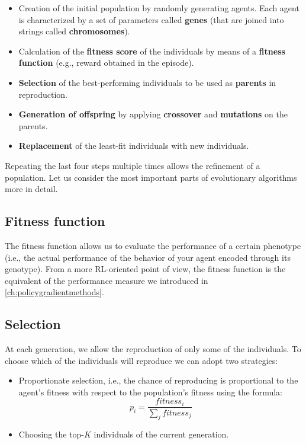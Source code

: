 \begin{itemize}
    \item Creation of the initial population by randomly generating agents. Each agent is characterized by a set of parameters called \textbf{genes} (that are joined into strings called \textbf{chromosomes}).
    \item Calculation of the \textbf{fitness score} of the individuals by means of a \textbf{fitness function} (e.g., reward obtained in the episode).
    \item \textbf{Selection} of the best-performing individuals to be used as \textbf{parents} in reproduction.
    \item \textbf{Generation of offspring} by applying \textbf{crossover} and \textbf{mutations} on the parents.
    \item \textbf{Replacement} of the least-fit individuals with new individuals.
\end{itemize}

Repeating the last four steps multiple times allows the refinement of a population. Let us consider the most important parts of evolutionary algorithms more in detail.

\subsection{Fitness function}
The fitness function allows us to evaluate the performance of a certain phenotype (i.e., the actual performance of the behavior of your agent encoded through its genotype). From a more RL-oriented point of view, the fitness function is the equivalent of the performance measure we introduced in \autoref{ch:policygradientmethods}.

\subsection{Selection}
At each generation, we allow the reproduction of only some of the individuals. To choose which of the individuals will reproduce we can adopt two strategies:

\begin{itemize}
    \item Proportionate selection, i.e., the chance of reproducing is proportional to the agent’s fitness with respect to the population’s fitness using the formula:
    \begin{equation*}
        p_i = \frac{fitness_i}{\sum_j fitness_j}
    \end{equation*}
    \item Choosing the top-$K$ individuals of the current generation.
\end{itemize}

